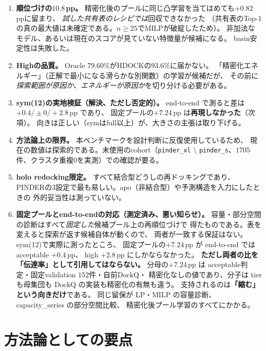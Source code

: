 \documentclass[11pt,a4paper]{article}
\newcommand{\dockq}{\mathrm{DockQ}}
\begin{document}
\begin{enumerate}
  \item \textbf{順位づけの$10.8$\,pp。}
        精密化後のプールに同じ凸学習を当てはめても$+0.82$\,ppに留まり、
        \emph{試した共有表のレシピでは}回収できなかった
        （共有表のTop-1の真の最大値は未確定である。$n \ge 25$でMILPが破綻したため）。
        非加法なモデル、あるいは現在のスコアが見ていない特徴量が候補になる。
        basin安定性は失敗した。
  \item \textbf{Highの品質。} Oracle $79.60\%$がHDOCKの$93.6\%$に届かない。
        「精密化エネルギー」（正解で最小になる滑らかな別関数）の学習が候補だが、
        その前に\emph{探索範囲が原因か、エネルギーが原因か}を切り分ける必要がある。
  \item \textbf{sym(12)の実地検証（解決、ただし否定的）。}
        end-to-end で測ると差は$+0.4 / \pm 0 / +2.8$\,pp であり、
        固定プールの$+7.24$\,pp は\textbf{再現しなかった}（次項）。
        向きは正しい（symはfull以上）が、大きさの主張は取り下げる。
  \item \textbf{方法論上の限界。} 本ベンチマークを設計判断に反復使用しているため、
        現在の数値は探索的である。未使用のcohort（\texttt{pinder\_xl} $\setminus$
        \texttt{pinder\_s}、$1705$件、クラスタ重複$0$を実測）での確認が要る。
  \item \textbf{holo redocking限定。} すべて結合型どうしの再ドッキングであり、
        PINDERの3設定で最も易しい。apo（非結合型）や予測構造を入力にしたときの
        外的妥当性は測っていない。
  \item \textbf{固定プールとend-to-endの対応（測定済み、悪い知らせ）。}
        容量・部分空間の診断はすべて\emph{固定した}候補プール上の再順位づけで
        得たものである。表を変えると探索が返す候補自体が動くので、
        両者が一致する保証はない。sym(12)で実際に測ったところ、
        固定プールの$+7.24$\,pp が end-to-end では acceptable $+0.4$\,pp、
        high $+2.8$\,pp にしかならなかった。
        \textbf{ただし両者の比を「伝達率」として引用してはならない。}
        分母の$+7.24$\,pp は acceptable判定・固定validation $152$件・自前$\dockq$・
        精密化なしの値であり、分子は tier も母集団も $\dockq$ の実装も精密化の有無も違う。
        支持されるのは\textbf{「縮む」という向きだけ}である。
        同じ留保が LP・MILP の容量診断、capacity\_series の部分空間比較、
        精密化後プール学習のすべてにかかる。
\end{enumerate}

\section{方法論としての要点}
\end{document}
